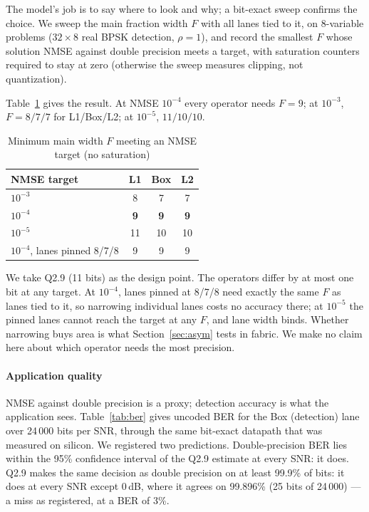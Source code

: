 \documentclass[conference]{IEEEtran}
\begin{document}
The model's job is to say where to look and why; a bit-exact sweep confirms the
choice. We sweep the main fraction width $F$ with all lanes tied to it, on
8-variable problems ($32\times8$ real BPSK detection, $\rho=1$), and record the
smallest $F$ whose solution NMSE against double precision meets a target, with
saturation counters required to stay at zero (otherwise the sweep measures
clipping, not quantization).

Table~\ref{tab:width} gives the result. At NMSE $10^{-4}$ every operator
needs $F=9$; at $10^{-3}$, $F=8/7/7$ for L1/Box/L2; at $10^{-5}$, $11/10/10$.

\begin{table}[t]
\centering\footnotesize
\caption{Minimum main width $F$ meeting an NMSE target (no saturation)}
\label{tab:width}
\begin{tabular}{lccc}
\toprule
NMSE target & L1 & Box & L2 \\
\midrule
$10^{-3}$ & 8 & 7 & 7 \\
$10^{-4}$ & \textbf{9} & \textbf{9} & \textbf{9} \\
$10^{-5}$ & 11 & 10 & 10 \\
\midrule
$10^{-4}$, lanes pinned 8/7/8 & 9 & 9 & 9 \\
\bottomrule
\end{tabular}
\end{table} We take Q2.9 (11 bits) as the design
point. The operators differ by at most one bit at any target. At
$10^{-4}$, lanes pinned at 8/7/8 need exactly the same $F$ as lanes tied to it,
so narrowing individual lanes costs no accuracy there; at $10^{-5}$ the pinned
lanes cannot reach the target at any $F$, and lane width binds. Whether
narrowing buys area is what Section~\ref{sec:asym} tests in fabric. We make no
claim here about which operator needs the most precision.

\paragraph{Application quality} NMSE against double precision is a proxy;
detection accuracy is what the application sees. Table~\ref{tab:ber} gives
uncoded BER for the Box (detection) lane over 24\,000 bits per SNR, through
the same bit-exact datapath that was measured on silicon. We registered two
predictions. Double-precision BER lies within the 95\% confidence interval of
the Q2.9 estimate at every SNR: it does. Q2.9 makes the same decision as double precision on at
least 99.9\% of bits: it does at every SNR except 0\,dB, where it agrees on
99.896\% (25 bits of 24\,000) --- a miss as registered, at a BER of 3\%.
\end{document}

